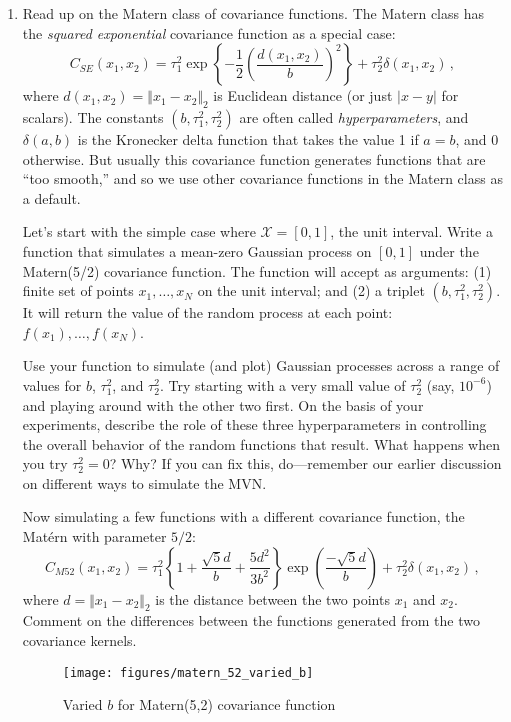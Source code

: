 \documentclass[10pt]{article}
\begin{document}
    \begin{enumerate}[label=(\Alph*)]
        \item   Read up on the Matern class of covariance functions.  The Matern class has the \textit{squared exponential} covariance function as a special case:
        $$
        C_{SE}(x_1, x_2) = \tau_1^2 \exp \left\{ - \frac{1}{2} \left( \frac{d(x_1, x_2)}{b} \right)^2 \right\} + \tau^2_2 \delta(x_1, x_2) \, ,
        $$
        where $d(x_1, x_2) = \Vert x_1 - x_2 \Vert_2$ is Euclidean distance (or just $|x-y|$ for scalars).  The constants $(b, \tau^2_1, \tau^2_2)$ are often called \textit{hyperparameters}, and $\delta(a,b)$ is the Kronecker delta function that takes the value 1 if $a=b$, and 0 otherwise.  But usually this covariance function generates functions that are ``too smooth,'' and so we use other covariance functions in the Matern class as a default.

        Let's start with the simple case where $\mathcal{X} = [0,1]$, the unit interval.  Write a function that simulates a mean-zero Gaussian process on $[0,1]$ under the Matern(5/2) covariance function.  The function will accept as arguments: (1) finite set of points $x_1, \ldots, x_N$ on the unit interval; and (2) a triplet $(b, \tau^2_1, \tau^2_2)$. It will return the value of the random process at each point: $f(x_1), \ldots, f(x_N)$.

        Use your function to simulate (and plot) Gaussian processes across a range of values for $b$, $\tau^2_1$, and $\tau^2_2$.  Try starting with a very small value of $\tau^2_2$ (say, $10^{-6}$) and playing around with the other two first.  On the basis of your experiments, describe the role of these three hyperparameters in controlling the overall behavior of the random functions that result.  What happens when you try $\tau^2_2 = 0$? Why?  If you can fix this, do---remember our earlier discussion on different ways to simulate the MVN.

        Now simulating a few functions with a different covariance function, the Mat\'ern with parameter $5/2$:
        $$
        C_{M52}(x_1, x_2) = \tau_1^2 \left\{ 1 + \frac{\sqrt{5}d}{b} + \frac{5d^2}{3b^2} \right\} \exp\left( \frac{-\sqrt{5}d}{b} \right) + \tau^2_2 \delta(x_1, x_2) \, ,
        $$
        where $d = \Vert x_1 - x_2 \Vert_2$ is the distance between the two points $x_1$ and $x_2$.  Comment on the differences between the functions generated from the two covariance kernels.\\

        \begin{figure}[ht] 
          \centering 
          \texttt{[image: figures/matern\_52\_varied\_b]}
          \caption{\label{fig:matern_52_varied_b} Varied $b$ for Matern(5,2) covariance function}
        \end{figure}


\end{enumerate}
\end{document}
